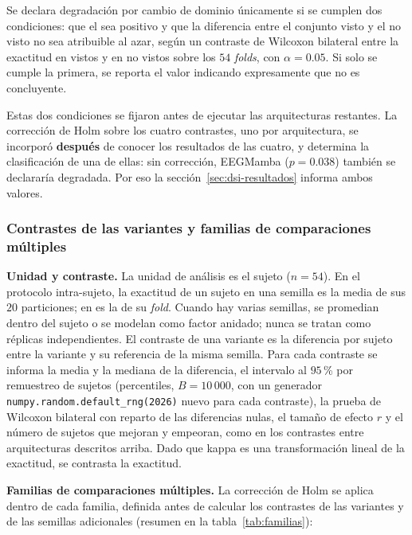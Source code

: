 Se declara degradación por cambio de dominio únicamente si se cumplen dos
condiciones: que el \dsi{} sea positivo y que la diferencia entre el conjunto
visto y el no visto no sea atribuible al azar, según un contraste de Wilcoxon bilateral
entre la exactitud en vistos y en no vistos sobre los $54$ \textit{folds}, con
$\alpha = 0.05$. Si solo se cumple la primera, se
reporta el valor indicando expresamente que no es concluyente.

Estas dos condiciones se fijaron antes de ejecutar las arquitecturas restantes. La
corrección de Holm sobre los cuatro contrastes, uno por arquitectura, se incorporó
\textbf{después} de conocer los resultados de las cuatro, y determina la clasificación de una
de ellas: sin corrección, EEGMamba ($p = 0.038$) también se declararía degradada. Por eso
la sección~\ref{sec:dsi-resultados} informa ambos valores.

\subsubsection{Contrastes de las variantes y familias de comparaciones múltiples}
\label{sec:estadistica-variantes}

\textbf{Unidad y contraste.} La unidad de análisis es el sujeto ($n = 54$). En el protocolo
intra-sujeto, la exactitud de un sujeto en una semilla es la media de sus $20$ particiones;
en \loso{} es la de su \textit{fold}. Cuando hay varias semillas, se promedian dentro del sujeto o
se modelan como factor anidado; nunca se tratan como réplicas independientes. El contraste
de una variante es la diferencia por sujeto entre la variante y su referencia de la misma
semilla. Para cada contraste se informa la media y la mediana de la diferencia, el
intervalo al $95$\,\% por remuestreo de sujetos (percentiles, $B = 10\,000$, con un
generador \texttt{numpy.random.default\_rng(2026)} nuevo para cada contraste), la prueba de
Wilcoxon bilateral con reparto de las diferencias nulas, el tamaño de efecto $r$ y el número
de sujetos que mejoran y empeoran, como en los contrastes entre arquitecturas descritos arriba. Dado que kappa
es una transformación lineal de la exactitud, se contrasta la exactitud.

\textbf{Familias de comparaciones múltiples.} La corrección de Holm se aplica dentro de
cada familia, definida antes de calcular los contrastes de las variantes y de las semillas adicionales (resumen en la tabla~\ref{tab:familias}):

